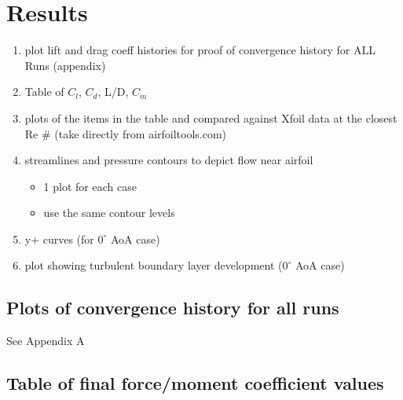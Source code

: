 \section{Results}

\begin{enumerate}
	\item plot lift and drag coeff histories for proof of convergence history for ALL Runs (appendix)
	\item Table of $C_l$, $C_d$, L/D, $C_m$
	\item plots of the items in the table and compared against Xfoil data at the closest Re \# (take directly from airfoiltools.com)
	\item streamlines and pressure contours to depict flow near airfoil
	\begin{itemize}
		\item 1 plot for each case
		\item use the same contour levels
	\end{itemize}
	\item y+ curves (for $0^\circ$ AoA case)
	\item plot showing turbulent boundary layer development ($0^\circ$ AoA case)
\end{enumerate}

\subsection{Plots of convergence history for all runs}
See Appendix A

\subsection{Table of final force/moment coefficient values}

